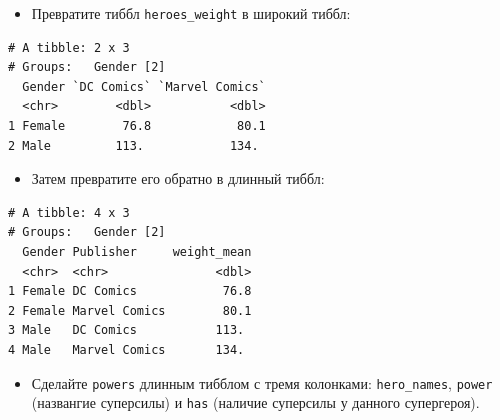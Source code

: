 \documentclass[
]{book}
\newenvironment{Shaded}{\begin{snugshade}}{\end{snugshade}}
\newcommand{\DataTypeTok}[1]{\textcolor[rgb]{0.13,0.29,0.53}{#1}}
\newcommand{\KeywordTok}[1]{\textcolor[rgb]{0.13,0.29,0.53}{\textbf{#1}}}
\newcommand{\NormalTok}[1]{#1}
\newcommand{\OperatorTok}[1]{\textcolor[rgb]{0.81,0.36,0.00}{\textbf{#1}}}
\newcommand{\StringTok}[1]{\textcolor[rgb]{0.31,0.60,0.02}{#1}}
\providecommand{\tightlist}{%
  \setlength{\itemsep}{0pt}\setlength{\parskip}{0pt}}
\begin{document}
\begin{itemize}
\tightlist
\item
  Превратите тиббл \texttt{heroes\_weight} в широкий тиббл:
\end{itemize}

\begin{Shaded}
\end{Shaded}

\begin{verbatim}
# A tibble: 2 x 3
# Groups:   Gender [2]
  Gender `DC Comics` `Marvel Comics`
  <chr>        <dbl>           <dbl>
1 Female        76.8            80.1
2 Male         113.            134. 
\end{verbatim}

\begin{itemize}
\tightlist
\item
  Затем превратите его обратно в длинный тиббл:
\end{itemize}

\begin{Shaded}
\end{Shaded}

\begin{verbatim}
# A tibble: 4 x 3
# Groups:   Gender [2]
  Gender Publisher     weight_mean
  <chr>  <chr>               <dbl>
1 Female DC Comics            76.8
2 Female Marvel Comics        80.1
3 Male   DC Comics           113. 
4 Male   Marvel Comics       134. 
\end{verbatim}

\begin{itemize}
\tightlist
\item
  Сделайте \texttt{powers} длинным тибблом с тремя колонками: \texttt{hero\_names}, \texttt{power} (названгие суперсилы) и \texttt{has} (наличие суперсилы у данного супергероя).
\end{itemize}
\end{document}
